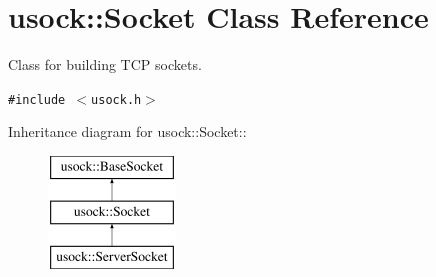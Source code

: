 \hypertarget{classusock_1_1Socket}{
\section{usock::Socket Class Reference}
\label{classusock_1_1Socket}
}
Class for building TCP sockets.  


{\tt \#include $<$usock.h$>$}

Inheritance diagram for usock::Socket::\begin{figure}[H]
\begin{center}
\leavevmode
\includegraphics[height=3cm]{classusock_1_1Socket}
\end{center}
\end{figure}
